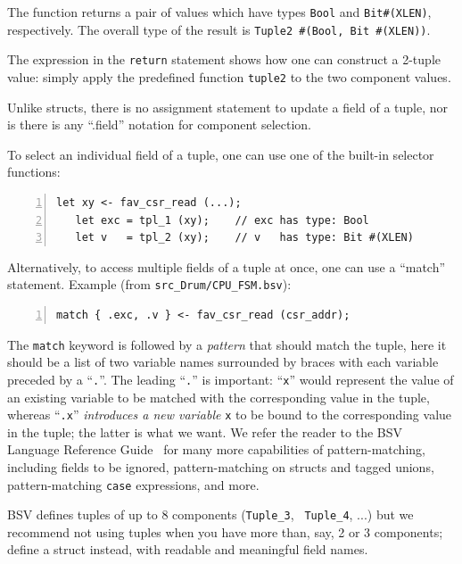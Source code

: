 The function returns a pair of values which have types \verb|Bool| and
\verb|Bit#(XLEN)|, respectively.  The overall type of the result is
\verb|Tuple2 #(Bool, Bit #(XLEN))|.

The expression in the \verb|return| statement shows how one can
construct a 2-tuple value: simply apply the predefined function
\verb|tuple2| to the two component values.

Unlike structs, there is no assignment statement to update a field of
a tuple, nor is there is any ``.field'' notation for component
selection.

To select an individual field of a tuple, one can use one of the
built-in selector functions:

{\footnotesize
\begin{Verbatim}[frame=single, numbers=left]
   let xy <- fav_csr_read (...);
   let exc = tpl_1 (xy);    // exc has type: Bool
   let v   = tpl_2 (xy);    // v   has type: Bit #(XLEN)
\end{Verbatim}
}

Alternatively, to access multiple fields of a tuple at once, one can
use a ``match'' statement. Example (from \verb|src_Drum/CPU_FSM.bsv|):


{\footnotesize
\begin{Verbatim}[frame=single, numbers=left]
   match { .exc, .v } <- fav_csr_read (csr_addr);
\end{Verbatim}
}

The \verb|match| keyword is followed by a \emph{pattern} that should
match the tuple, {\ie} here it should be a list of two variable names
surrounded by braces with each variable preceded by a ``\verb|.|''.
The leading ``\verb|.|'' is important: ``\verb|x|'' would represent
the value of an existing variable to be matched with the corresponding
value in the tuple, whereas ``\verb|.x|'' \emph{introduces a new
variable} \verb|x| to be bound to the corresponding value in the
tuple; the latter is what we want.  We refer the reader to the BSV
Language Reference Guide~\cite{BSV_Lang_Ref_Guide} for many more
capabilities of pattern-matching, including fields to be ignored,
pattern-matching on structs and tagged unions, pattern-matching
\verb|case| expressions, and more.

BSV defines tuples of up to 8 components ({\tt Tuple\_3}, {\tt
Tuple\_4}, ...) but we recommend not using tuples when you have more
than, say, 2 or 3 components; define a struct instead, with readable
and meaningful field names.

